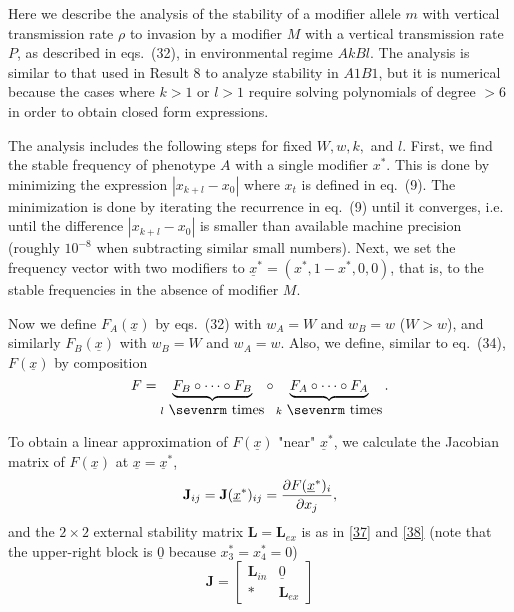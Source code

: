 \documentclass[9pt, a4paper]{extarticle}
\newcommand{\cl}{\mathbf{L}}
\newcommand{\cj}{\mathbf{J}}
\begin{document}
Here we describe the analysis of the stability of a modifier allele $m$ with vertical transmission rate $\rho$ to invasion by a modifier $M$ with a vertical transmission rate $P$, as described in eqs.~(32), in environmental regime $AkBl$.
The analysis is similar to that used in Result 8 to analyze stability in $A1B1$, but it is numerical because the cases where $k>1$ or $l>1$ require solving polynomials of degree $>6$  in order to obtain closed form expressions.

The analysis includes the following steps for fixed $W, w, k,$ and $l$.
First, we find the stable frequency of phenotype $A$ with a single modifier $x^*$. This is done by minimizing the expression $|x_{k+l} - x_{0}|$ where $x_{t}$ is defined in eq.~(9). The minimization is done by iterating the recurrence in eq.~(9) until it converges, i.e. until the difference $|x_{k+l} - x_{0}|$ is smaller than available machine precision (roughly $10^{-8}$ when subtracting similar small numbers).
Next, we set the frequency vector with two modifiers to $\underline x^*=(x^*, 1-x^*, 0, 0)$, that is, to the stable frequencies in the absence of modifier $M$.

Now we define $F_A(\underline x)$ by eqs.~(32) with $w_A=W$ and $w_B=w$ ($W>w$), and similarly $F_B(\underline x)$ with $w_B=W$ and $w_A=w$.
Also, we define, similar to eq.~(34), $F(\underline x)$ by composition
\begin{equation} \label{eq:S53}
F=\underbrace{F_B\circ \cdots\circ F_B}_{l\ \hbox{\sevenrm times}} \circ\underbrace{F_A\circ \cdots\circ F_A}_{k\ \hbox{\sevenrm times}}.
\end{equation} 

To obtain a linear approximation of $F(\underline x)$ "near" $\underline x^*$, we calculate the Jacobian matrix of $F(\underline x)$ at $\underline x = \underline x^*$,
\begin{equation} \label{eq:S54}
\cj_{ij} = \cj(\underline x^*)_{ij} = {\partial F(\underline x^*)_i \over \partial x_j},
\end{equation} 
and the $2\times 2$ external stability matrix $\cl=\cl_{ex}$ is as in \eqref{37} and \eqref{38} (note that the upper-right block is $\underline 0$ because $x^*_3=x^*_4=0$)
\begin{equation}
\cj = \begin{bmatrix}
\cl_{in} & \underline 0 \\
 * & \cl_{ex}
\end{bmatrix}
\end{equation} 
\end{document}
